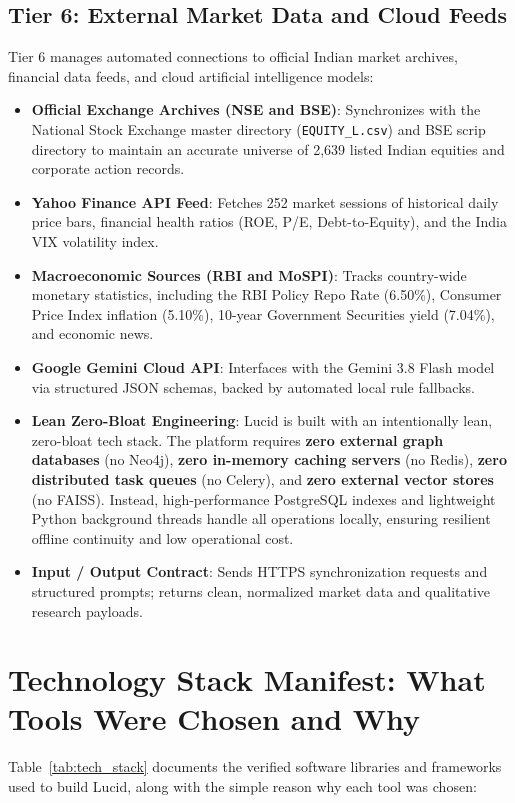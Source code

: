 \subsection{Tier 6: External Market Data and Cloud Feeds}
Tier 6 manages automated connections to official Indian market archives, financial data feeds, and cloud artificial intelligence models:
\begin{itemize}
    \item \textbf{Official Exchange Archives (NSE and BSE)}: Synchronizes with the National Stock Exchange master directory (\texttt{EQUITY\_L.csv}) and BSE scrip directory to maintain an accurate universe of 2,639 listed Indian equities and corporate action records.
    \item \textbf{Yahoo Finance API Feed}: Fetches 252 market sessions of historical daily price bars, financial health ratios (ROE, P/E, Debt-to-Equity), and the India VIX volatility index.
    \item \textbf{Macroeconomic Sources (RBI and MoSPI)}: Tracks country-wide monetary statistics, including the RBI Policy Repo Rate (6.50\%), Consumer Price Index inflation (5.10\%), 10-year Government Securities yield (7.04\%), and economic news.
    \item \textbf{Google Gemini Cloud API}: Interfaces with the Gemini 3.8 Flash model via structured JSON schemas, backed by automated local rule fallbacks.
    \item \textbf{Lean Zero-Bloat Engineering}: Lucid is built with an intentionally lean, zero-bloat tech stack. The platform requires \textbf{zero external graph databases} (no Neo4j), \textbf{zero in-memory caching servers} (no Redis), \textbf{zero distributed task queues} (no Celery), and \textbf{zero external vector stores} (no FAISS). Instead, high-performance PostgreSQL indexes and lightweight Python background threads handle all operations locally, ensuring resilient offline continuity and low operational cost.
    \item \textbf{Input / Output Contract}: Sends HTTPS synchronization requests and structured prompts; returns clean, normalized market data and qualitative research payloads.
\end{itemize}

\section{Technology Stack Manifest: What Tools Were Chosen and Why}
Table~\ref{tab:tech_stack} documents the verified software libraries and frameworks used to build Lucid, along with the simple reason why each tool was chosen:

